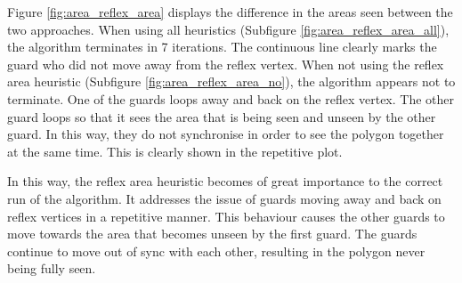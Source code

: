 Figure \ref{fig:area_reflex_area} displays the difference in the areas seen between the two approaches. When using all heuristics (Subfigure \ref{fig:area_reflex_area_all}), the algorithm terminates in 7 iterations. The continuous line clearly marks the guard who did not move away from the reflex vertex. When not using the reflex area heuristic (Subfigure \ref{fig:area_reflex_area_no}), the algorithm appears not to terminate. One of the guards loops away and back on the reflex vertex. The other guard loops so that it sees the area that is being seen and unseen by the other guard. In this way, they do not synchronise in order to see the polygon together at the same time. This is clearly shown in the repetitive plot.

In this way, the reflex area heuristic becomes of great importance to the correct run of the algorithm. It addresses the issue of guards moving away and back on reflex vertices in a repetitive manner. This behaviour causes the other guards to move towards the area that becomes unseen by the first guard. The guards continue to move out of sync with each other, resulting in the polygon never being fully seen.

